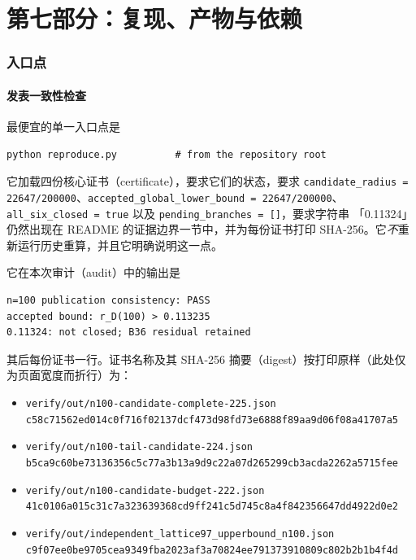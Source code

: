 \part*{第七部分：复现、产物与依赖}
\setcounter{section}{0}

\section{入口点}

\subsection{发表一致性检查}

最便宜的单一入口点是
\begin{verbatim}
python reproduce.py          # from the repository root
\end{verbatim}
它加载四份核心证书（certificate），要求它们的状态，要求
\texttt{candidate\_\allowbreak{}radius = 22647/\allowbreak{}200000}、\texttt{accepted\_\allowbreak{}global\_\allowbreak{}lower\_\allowbreak{}bound = 22647/\allowbreak{}200000}、
\texttt{all\_\allowbreak{}six\_\allowbreak{}closed = true} 以及 \texttt{pending\_\allowbreak{}branches = []}，要求字符串
「0.11324」仍然出现在 README 的证据边界一节中，并为每份证书打印 SHA-256。它\emph{不}重新运行历史重算，并且它明确说明这一点。

它在本次审计（audit）中的输出是
\begin{verbatim}
n=100 publication consistency: PASS
accepted bound: r_D(100) > 0.113235
0.11324: not closed; B36 residual retained
\end{verbatim}
其后每份证书一行。证书名称及其 SHA-256 摘要（digest）按打印原样（此处仅为页面宽度而折行）为：
\begin{itemize}[leftmargin=1.4em,itemsep=2pt]
\item {\footnotesize\texttt{verify/\allowbreak{}out/\allowbreak{}n100-\allowbreak{}candidate-\allowbreak{}complete-\allowbreak{}225.json}}\\
{\footnotesize\texttt{c58c71562ed014c0f716f02137dcf473d98fd73e6888f89aa9d06f08a41707a5}}
\item {\footnotesize\texttt{verify/\allowbreak{}out/\allowbreak{}n100-\allowbreak{}tail-\allowbreak{}candidate-\allowbreak{}224.json}}\\
{\footnotesize\texttt{b5ca9c60be73136356c5c77a3b13a9d9c22a07d265299cb3acda2262a5715fee}}
\item {\footnotesize\texttt{verify/\allowbreak{}out/\allowbreak{}n100-\allowbreak{}candidate-\allowbreak{}budget-\allowbreak{}222.json}}\\
{\footnotesize\texttt{41c0106a015c31c7a323639368cd9ff241c5d745c8a4f842356647dd4922d0e2}}
\item {\footnotesize\texttt{verify/\allowbreak{}out/\allowbreak{}independent\_\allowbreak{}lattice97\_\allowbreak{}upperbound\_\allowbreak{}n100.json}}\\
{\footnotesize\texttt{c9f07ee0be9705cea9349fba2023af3a70824ee791373910809c802b2b1b4f4d}}
\end{itemize}

